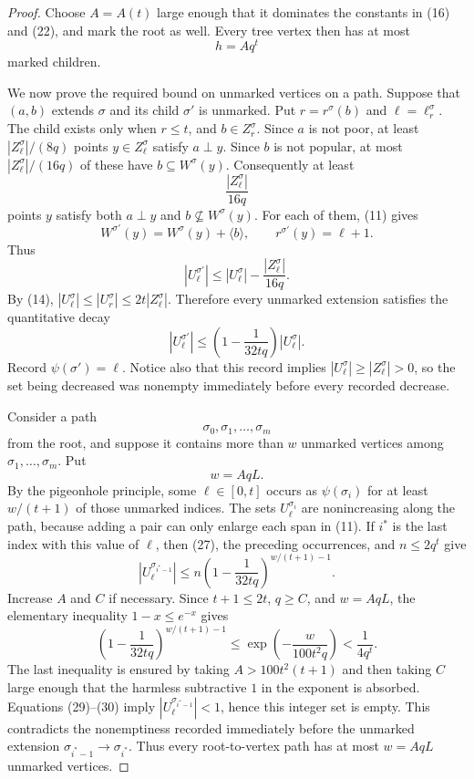 \begin{proof}
Choose $A=A(t)$ large enough that it dominates the constants in (16) and
(22), and mark the root as well.  Every tree vertex then has at most
\[
                         h=Aq^t                              \tag{23}
\]
marked children.

We now prove the required bound on unmarked vertices on a path.  Suppose
that $(a,b)$ extends $\sigma$ and its child $\sigma'$ is unmarked.  Put
$r=r^\sigma(b)$ and $\ell=\ell_r^\sigma$.  The child exists only when
$r\leq t$, and $b\in Z_r^\sigma$.  Since $a$ is not poor, at least
$|Z_\ell^\sigma|/(8q)$ points $y\in Z_\ell^\sigma$ satisfy $a\perp y$.
Since $b$ is not popular, at most
$|Z_\ell^\sigma|/(16q)$ of these have $b\subseteq W^\sigma(y)$.
Consequently at least
\[
                         \frac{|Z_\ell^\sigma|}{16q}             \tag{24}
\]
points $y$ satisfy both $a\perp y$ and
$b\not\subseteq W^\sigma(y)$.  For each of them, (11) gives
\[
 W^{\sigma'}(y)=W^\sigma(y)+\langle b\rangle,\qquad
 r^{\sigma'}(y)=\ell+1.                                      \tag{25}
\]
Thus
\[
 |U_\ell^{\sigma'}|
 \leq |U_\ell^\sigma|-\frac{|Z_\ell^\sigma|}{16q}.             \tag{26}
\]
By (14), $|U_\ell^\sigma|\leq|U_r^\sigma|\leq2t|Z_\ell^\sigma|$.
Therefore every unmarked extension satisfies the quantitative decay
\[
 |U_\ell^{\sigma'}|\leq
 \left(1-\frac1{32tq}\right)|U_\ell^\sigma|.                  \tag{27}
\]
Record $\psi(\sigma')=\ell$.  Notice also that this record implies
$|U_\ell^\sigma|\geq|Z_\ell^\sigma|>0$, so the set being decreased was
nonempty immediately before every recorded decrease.

Consider a path
\[
 \sigma_0,\sigma_1,\ldots,\sigma_m
\]
from the root, and suppose it contains more than $w$ unmarked vertices
among $\sigma_1,\ldots,\sigma_m$.  Put
\[
                         w=AqL.                               \tag{28}
\]
By the pigeonhole principle, some $\ell\in[0,t]$ occurs as
$\psi(\sigma_i)$ for at least $w/(t+1)$ of those unmarked indices.  The
sets $U_\ell^{\sigma_i}$ are nonincreasing along the path, because adding
a pair can only enlarge each span in (11).  If $i^*$ is the last index
with this value of $\ell$, then (27), the preceding occurrences, and
$n\leq2q^t$ give
\[
 |U_\ell^{\sigma_{i^*-1}}|
 \leq n\left(1-\frac1{32tq}\right)^{w/(t+1)-1}.                \tag{29}
\]
Increase $A$ and $C$ if necessary.  Since $t+1\leq2t$, $q\geq C$, and
$w=AqL$, the elementary inequality $1-x\leq e^{-x}$ gives
\[
 \left(1-\frac1{32tq}\right)^{w/(t+1)-1}
 \leq \exp\left(-\frac{w}{100t^2q}\right)
 <\frac1{4q^t}.                                                \tag{30}
\]
The last inequality is ensured by taking $A>100t^2(t+1)$ and then taking
$C$ large enough that the harmless subtractive $1$ in the exponent is
absorbed.  Equations (29)--(30) imply
$|U_\ell^{\sigma_{i^*-1}}|<1$, hence this integer set is empty.  This
contradicts the nonemptiness recorded immediately before the unmarked
extension $\sigma_{i^*-1}\to\sigma_{i^*}$.  Thus every root-to-vertex path
has at most $w=AqL$ unmarked vertices.


\end{proof}
